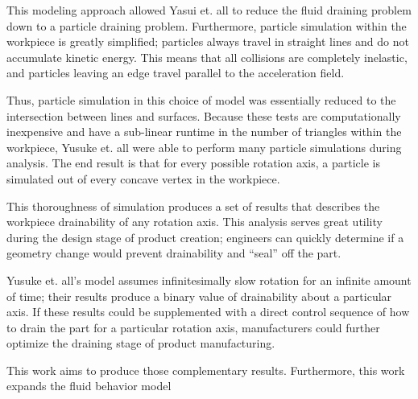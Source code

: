 This modeling approach allowed Yasui et. all to reduce the fluid draining problem down to a particle draining problem. Furthermore, particle simulation within the workpiece is greatly simplified; particles always travel in straight lines and do not accumulate kinetic energy. This means that all collisions are completely inelastic, and particles leaving an edge travel parallel to the acceleration field.

Thus, particle simulation in this choice of model was essentially reduced to the intersection between lines and surfaces. Because these tests are computationally inexpensive and have a sub-linear runtime in the number of triangles within the workpiece, Yusuke et. all were able to perform many particle simulations during analysis. The end result is that for every possible rotation axis, a particle is simulated out of every concave vertex in the workpiece.

This thoroughness of simulation produces a set of results that describes the workpiece drainability of any rotation axis. This analysis serves great utility during the design stage of product creation; engineers can quickly determine if a geometry change would prevent drainability and ``seal'' off the part.

Yusuke et. all's model assumes infinitesimally slow rotation for an infinite amount of time; their results produce a binary value of drainability about a particular axis. If these results could be supplemented with a direct control sequence of how to drain the part for a particular rotation axis, manufacturers could further optimize the draining stage of product manufacturing.

This work aims to produce those complementary results. Furthermore, this work expands the fluid behavior model





